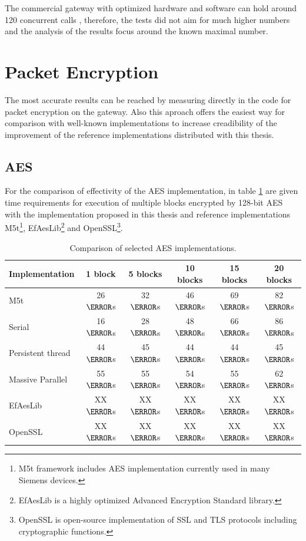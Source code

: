 The commercial gateway with optimized hardware and software can hold around 120 
concurrent calls \cite{hp4k}, therefore, the tests did not aim for much higher
numbers and the analysis of the results focus around the known maximal number. 

\section{Packet Encryption}
The most accurate results can be reached by measuring directly in the code for
packet encryption on the gateway. Also this aproach offers the easiest way
for comparison with well-known implementations to increase creadibility of 
the improvement of the reference implementations distributed with this thesis. 

\subsection*{AES}
For the comparison of effectivity of the AES implementation, in table 
\ref{aes-comparison} are given time requirements for execution of multiple
blocks encrypted by 128-bit AES with the implementation proposed in this thesis
and reference implementations M5t\footnote{ M5t framework includes AES 
implementation currently used in many Siemens devices\cite{m5t}.}, 
EfAesLib\footnote{ EfAesLib is a highly optimized Advanced Encryption Standard 
library\cite{aes-lib}.} and OpenSSL\footnote{ OpenSSL is open-source 
implementation of SSL and TLS protocols including cryptographic 
functions\cite{openssl}.}.
\begin{table}[H]
\begin{center}
\begin{tabular}{|l|ccccc|}\hline%
Implementation &  1 block & 5 blocks & 10 blocks & 15 blocks & 20 blocks\\\hline
M5t  &26 $\micro$s&32 $\micro$s&46 $\micro$s&69 $\micro$s&82 $\micro$s\\ 
Serial  &16 $\micro$s&28 $\micro$s&48 $\micro$s&66 $\micro$s&86 $\micro$s\\
Persistent thread&44 $\micro$s&45 $\micro$s&44 $\micro$s&44 $\micro$s&45 $\micro$s\\
Massive Parallel&55 $\micro$s&55 $\micro$s&54 $\micro$s&55 $\micro$s&62 $\micro$s\\
EfAesLib &XX $\micro$s&XX $\micro$s&XX $\micro$s&XX $\micro$s&XX $\micro$s\\
OpenSSL &XX $\micro$s&XX $\micro$s&XX $\micro$s&XX $\micro$s&XX $\micro$s\\\hline
\end{tabular}
\end{center}
\caption{Comparison of selected AES implementations.}
\label{aes-comparison}
\end{table}

